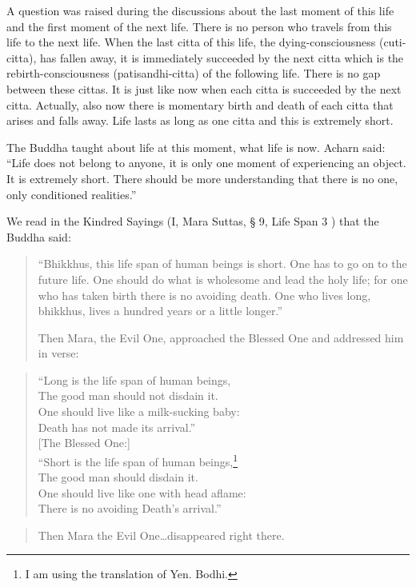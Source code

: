 A question was raised during the discussions about the last moment of this life 
and the first moment of the next life. There is no person who travels from this 
life to the next life. When the last citta of this life, the dying-consciousness 
(cuti-citta), has fallen away, it is immediately succeeded by the next citta which 
is the rebirth-consciousness (patisandhi-citta) of the following life. There is no 
gap between these cittas. It is just like now when each citta is succeeded by the 
next citta. Actually, also now there is momentary birth and death of each citta 
that arises and falls away. Life lasts as long as one citta and this is extremely 
short. 

The Buddha taught about life at this moment, what life is now. Acharn said: 
``Life does not belong to anyone, it is only one moment of experiencing an object. It is extremely short. There should be more understanding that there is no 
one, only conditioned realities.'' 

We read in the Kindred Sayings (I, Mara Suttas, § 9, Life Span 3 ) that the Buddha said: 
\begin{quote}

``Bhikkhus, this life span of human beings is short. One has to go 
on to the future life. One should do what is wholesome and lead 
the holy life; for one who has taken birth there is no avoiding 
death. One who lives long, bhikkhus, lives a hundred years or a 
little longer.'' 

Then Mara, the Evil One, approached the Blessed One and addressed him in verse: 
\end{quote}

\begin{verse}

``Long is the life span of human beings, \\
The good man should not disdain it. \\
One should live like a milk-sucking baby: \\
Death has not made its arrival.'' \\

[The Blessed One:] \\

``Short is the life span of human beings,\footnote{I am using the translation of Yen. Bodhi.} \\
The good man should disdain it. \\
One should live like one with head aflame: \\
There is no avoiding Death's arrival.'' \\
\end{verse}
\begin{quote}
Then Mara the Evil One\ldots disappeared right there. 
\end{quote}

